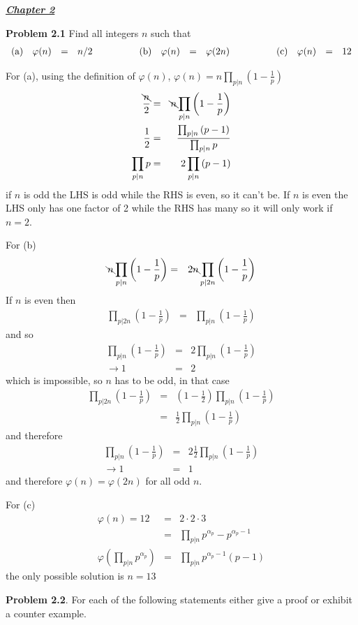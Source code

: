 \documentclass[aps,preprint,preprintnumbers,nofootinbib,showpacs,prd]{revtex4-1}
\newcommand{\nbea}{\begin{eqnarray*}}
\newcommand{\neea}{\end{eqnarray*}}
\begin{document}
\bigskip
\underline{\textbf{\textit{Chapter 2}}}
\bigskip

{\bf Problem 2.1} Find all integers $n$ such that
%
\nbea
\begin{array}{l r c l c l r c l c l r c l}
{\rm(a)} & \varphi(n) & = & n/2 & ~~~~~~~~~ & {\rm(b)} & \varphi(n) & = & \varphi(2n) & ~~~~~~~~~ & {\rm(c)} & \varphi(n) & = & 12
\end{array}
\neea
%

For (a), using the definition of $\varphi(n)$, $\varphi(n) = n \prod_{p|n} \left ( 1 - \frac{1}{p} \right )$
%
\nbea
\frac{\bcancel{n}}{2} & = & \bcancel{n} \prod_{p|n} \left ( 1 - \frac{1}{p} \right ) \\
\frac{1}{2} & = & \frac{\prod_{p|n} \left ( p - 1 \right )}{\prod_{p|n} p} \\
\prod_{p|n} p & = & 2\prod_{p|n} \left ( p - 1 \right )
\neea
%
if $n$ is odd the LHS is odd while the RHS is even, so it can't be. If $n$ is even the LHS only has one factor of 2 while the RHS has many so it will only work if $n=2$.

For (b)
%
\nbea
\bcancel{n} \prod_{p|n} \left ( 1 - \frac{1}{p} \right )  & = & 2\bcancel{n} \prod_{p|2n} \left ( 1 - \frac{1}{p} \right )
\neea
%
If $n$ is even then
%
\nbea
\prod_{p|2n} \left ( 1 - \frac{1}{p} \right ) & = & \prod_{p|n} \left ( 1 - \frac{1}{p} \right )
\neea
%
and so
%
\nbea
\prod_{p|n} \left ( 1 - \frac{1}{p} \right )  & = & 2\prod_{p|n} \left ( 1 - \frac{1}{p} \right ) \\
\to 1 & = & 2
\neea
%
which is impossible, so $n$ has to be odd, in that case
%
\nbea
\prod_{p|2n} \left ( 1 - \frac{1}{p} \right ) & = & \left ( 1 - \frac{1}{2} \right ) \prod_{p|n} \left ( 1 - \frac{1}{p} \right ) \\
& = & \frac{1}{2} \prod_{p|n} \left ( 1 - \frac{1}{p} \right )
\neea
%
and therefore
%
\nbea
\prod_{p|n} \left ( 1 - \frac{1}{p} \right )  & = & 2 \frac{1}{2} \prod_{p|n} \left ( 1 - \frac{1}{p} \right ) \\
\to 1 & = & 1
\neea
%
and therefore $\varphi(n) = \varphi(2n)$ for all odd $n$.

For (c)
%
\nbea
\varphi(n) = 12 & = & 2 \cdot 2 \cdot 3 \\
& = & \prod_{p|n} p^{\alpha_p} - p^{\alpha_p-1} \\
\varphi\left (\prod_{p|n} p^{\alpha_p} \right ) & = & \prod_{p|n}p^{\alpha_p-1} (p - 1)
\neea
%
the only possible solution is $n=13$

{\bf Problem 2.2}. For each of the following statements either give a proof or exhibit a counter example.
\end{document}
